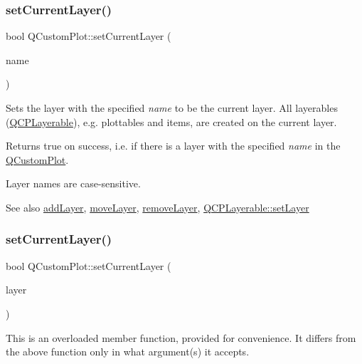 \subsubsection{\texorpdfstring{set\+Current\+Layer()}{setCurrentLayer()}\hspace{0.1cm}{\footnotesize\ttfamily [1/2]}}
{\footnotesize\ttfamily bool Q\+Custom\+Plot\+::set\+Current\+Layer (\begin{DoxyParamCaption}\item[{const Q\+String \&}]{name }\end{DoxyParamCaption})}

Sets the layer with the specified {\itshape name} to be the current layer. All layerables (\hyperlink{class_q_c_p_layerable}{Q\+C\+P\+Layerable}), e.\+g. plottables and items, are created on the current layer.

Returns true on success, i.\+e. if there is a layer with the specified {\itshape name} in the \hyperlink{class_q_custom_plot}{Q\+Custom\+Plot}.

Layer names are case-\/sensitive.

\begin{DoxySeeAlso}{See also}
\hyperlink{class_q_custom_plot_ad5255393df078448bb6ac83fa5db5f52}{add\+Layer}, \hyperlink{class_q_custom_plot_ae896140beff19424e9e9e02d6e331104}{move\+Layer}, \hyperlink{class_q_custom_plot_a40f75e342c5eaab6a86066a42a0e2a94}{remove\+Layer}, \hyperlink{class_q_c_p_layerable_ab0d0da6d2de45a118886d2c8e16d5a54}{Q\+C\+P\+Layerable\+::set\+Layer} 
\end{DoxySeeAlso}
\mbox{\label{class_q_custom_plot_a23a4d3cadad1a0063c5fe19aac5659e6}} 
\subsubsection{\texorpdfstring{set\+Current\+Layer()}{setCurrentLayer()}\hspace{0.1cm}{\footnotesize\ttfamily [2/2]}}
{\footnotesize\ttfamily bool Q\+Custom\+Plot\+::set\+Current\+Layer (\begin{DoxyParamCaption}\item[{\hyperlink{class_q_c_p_layer}{Q\+C\+P\+Layer} $\ast$}]{layer }\end{DoxyParamCaption})}

This is an overloaded member function, provided for convenience. It differs from the above function only in what argument(s) it accepts.

